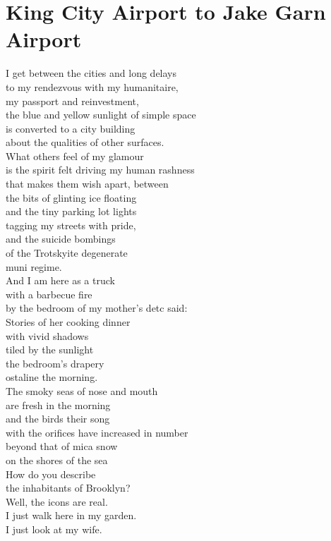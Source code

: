 \documentclass[smalldemyvopaper,11pt,twoside,onecolumn,openright,extrafontsizes]{memoir}
\begin{document}
\chapter{King City Airport to Jake Garn Airport}
I get between the cities and long delays
\\to my rendezvous with my humanitaire,
\\my passport and reinvestment,
\\the blue and yellow sunlight of simple space
\\is converted to a city building
\\about the qualities of other surfaces.
\\What others feel of my glamour
\\is the spirit felt driving my human rashness
\\that makes them wish apart, between
\\the bits of glinting ice floating
\\and the tiny parking lot lights
\\tagging my streets with pride,
\\and the suicide bombings
\\of the Trotskyite degenerate
\\muni regime.
\\And I am here as a truck
\\with a barbecue fire
\\by the bedroom of my mother's detc said:
\\Stories of her cooking dinner
\\with vivid shadows
\\tiled by the sunlight
\\the bedroom's drapery
\\ostaline the morning.
\\The smoky seas of nose and mouth
\\are fresh in the morning
\\and the birds their song
\\with the orifices have increased in number
\\beyond that of mica snow
\\on the shores of the sea
\\How do you describe
\\the inhabitants of Brooklyn?
\\Well, the icons are real.
\\I just walk here in my garden.
\\I just look at my wife.
\end{document}
